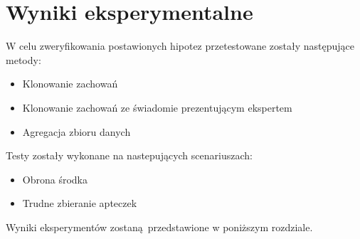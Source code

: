 \chapter{Wyniki eksperymentalne}

W celu zweryfikowania postawionych hipotez przetestowane zostały następujące metody:

\begin{itemize}
\item{Klonowanie zachowań}
\item{Klonowanie zachowań ze świadomie prezentującym ekspertem}
\item{Agregacja zbioru danych}
\end{itemize}

Testy zostały wykonane na nastepujących scenariuszach:

\begin{itemize}
\item{Obrona środka}
\item{Trudne zbieranie apteczek}
\end{itemize}

Wyniki eksperymentów zostaną przedstawione w poniższym rozdziale.








